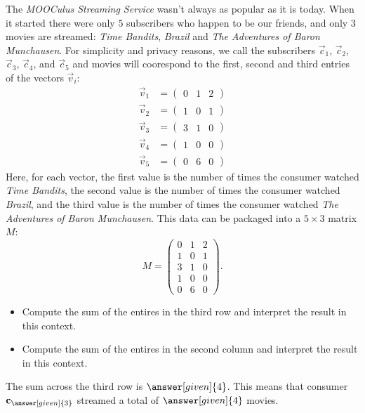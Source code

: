 \documentclass{ximera}
\begin{document}
\begin{example}
  The \textit{MOOCulus Streaming Service} wasn't always as popular as
  it is today. When it started there were only $5$ subscribers who
  happen to be our friends, and only $3$ movies are streamed:
  \textit{Time Bandits}, \textit{Brazil} and \textit{The Adventures of Baron
    Munchausen}. For simplicity and privacy reasons, we call the
  subscribers $\vec c_1$, $\vec c_2$, $\vec c_3$, $\vec c_4$, and
  $\vec c_5$ and movies will coorespond to the first, second and third
  entries of the vectors $\vec v_i$:
  \begin{align*}
    \vec v_{1} &= \begin{pmatrix}0 & 1 & 2\end{pmatrix}\\
    \vec v_{2} &= \begin{pmatrix}1 & 0 & 1\end{pmatrix}\\
    \vec v_{3} &= \begin{pmatrix}3 & 1 & 0\end{pmatrix}\\
    \vec v_{4} &= \begin{pmatrix}1 & 0 & 0\end{pmatrix}\\
    \vec v_{5} &= \begin{pmatrix}0 & 6 & 0\end{pmatrix}
  \end{align*}
  Here, for each vector, the first value is the number of times the
  consumer watched \textit{Time Bandits}, the second value is the
  number of times the consumer watched \textit{Brazil}, and the third
  value is the number of times the consumer watched \textit{The
    Adventures of Baron Munchausen}.  This data can be packaged into a
  $5 \times 3$ matrix $M$:
  \[
    M =
    \begin{pmatrix}
      0 & 1 & 2\\
      1 & 0 & 1\\
      3 & 1 & 0\\
      1 & 0 & 0\\
      0 & 6 & 0
    \end{pmatrix}.
  \]
  \begin{itemize}
  \item Compute the sum of the entires in the third row and interpret the result in this context.
  \item Compute the sum of the entires in the second column and interpret the result in this context.
  \end{itemize}
  \begin{explanation}
    The sum across the third row is $\answer[given]{4}$. This means
    that consumer $\vec{c}_{\answer[given]{3}}$ streamed a total of  $\answer[given]{4}$  movies.



\end{explanation}
\end{example}
\end{document}
